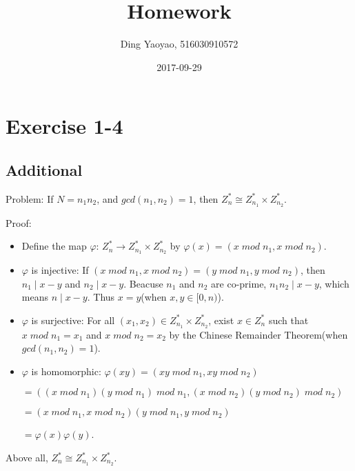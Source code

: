 \documentclass{article}
\title{Homework}
\date{2017-09-29}
\author{Ding Yaoyao, 516030910572}
\begin{document}
	\maketitle

	\section*{Exercise 1-4}
		\subsection*{Additional}

		 Problem: If $N = n_1 n_2$, and $gcd(n_1, n_2) = 1$, then $Z_n^{*} \cong Z_{n_1}^{*}\times Z_{n_2}^{*}$.

		 Proof:

		\begin{itemize}
			\item Define the map $\varphi$: $Z_n^{*} \rightarrow Z_{n_1}^{*} \times
				Z_{n_2}^{*}$ by $\varphi(x) = (x \; mod \; n_1, x \; mod \; n_2)$.
			\item $\varphi$ is injective: If $(x \; mod \; n_1, x \; mod \; n_2) = (y
				\; mod \; n_1, y \; mod \; n_2)$, then $n_1 \mid x - y$ and $n_2 \mid x
				- y$. Beacuse $n_1$ and $n_2$ are co-prime, $n_1n_2 \mid x - y$, which
				means $n \mid x - y$. Thus $x = y$(when $x,y \in [0,n)$).
			\item $\varphi$ is surjective: For all $(x_1,x_2) \in Z_{n_1}^*\times
				Z_{n_2}^{*}$, exist $x \in Z_n^{*}$ such that $x \; mod \; n_1 = x_1$
				and $x \; mod \; n_2 = x_2$ by the Chinese Remainder Theorem(when
				$gcd(n_1,n_2) = 1$).
			\item $\varphi$ is homomorphic: 
				$\varphi(xy) = (xy \; mod \; n_1, xy \; mod \; n_2) $ 

				$= ((x \; mod \; n_1)(y \; mod \; n_1) \; mod \; n_1, (x \; mod \; n_2)(y \; mod \; n_2) \; mod \; n_2) $ 

				$ = (x \; mod \; n_1, x \; mod \; n_2)(y \; mod \; n_1, y \; mod \; n_2) $ 

				$= \varphi(x)\varphi(y)$.
		\end{itemize}

		Above all, $Z_n^{*} \cong Z_{n_1}^{*}\times Z_{n_2}^{*}$.
\end{document}
